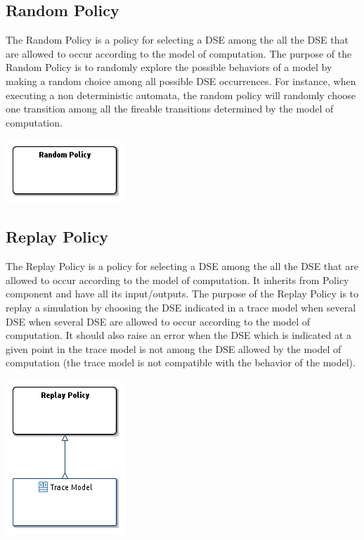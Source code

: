 \documentclass{gemoc} %
\begin{document}
\subsection{Random Policy}
\label{sec:Random_Policy}
The Random Policy is a policy for selecting a DSE among the all the DSE that are allowed to occur according to the model of computation.
The purpose of the Random Policy is to randomly explore the possible behaviors of a model by making a random choice among all possible DSE occurrences. For instance, when executing a non deterministic automata, the random policy will randomly choose one transition among all the fireable transitions determined by the model of computation.
\begin{center}
\includegraphics*[trim=0.0cm 0.0cm 0cm 0.0cm, clip=true]{../images/generated/Generated_Random_Policy.png}
\end{center}




\subsection{Replay Policy}
\label{sec:Replay_Policy}
The Replay Policy is a policy for selecting a DSE among the all the DSE that are allowed to occur according to the model of computation.
It inherits from Policy component and have all its input/outputs.
The purpose of the Replay Policy is to replay a simulation by choosing the DSE indicated in a trace model when several DSE when several DSE are allowed to occur according to the model of computation. It should also raise an error when the DSE which is indicated at a given point in the trace model is not among the DSE allowed by the model of computation (the trace model is not compatible with the behavior of the model).
\begin{center}
\includegraphics*[trim=0.0cm 0.0cm 0cm 0.0cm, clip=true]{../images/generated/Generated_Replay_Policy.png}
\end{center}
\end{document}
